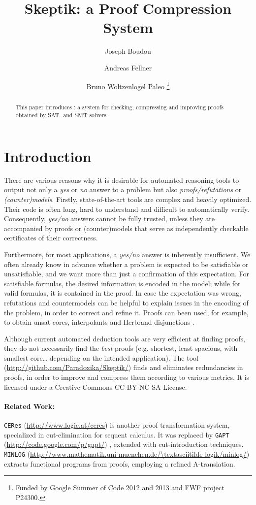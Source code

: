 \documentclass{llncs}
\title{ 
Skeptik: a Proof Compression System
}
\author{
  Joseph Boudou\inst{1}
  \and 
  Andreas Fellner\inst{2,3}
  \and 
  Bruno Woltzenlogel Paleo\inst{3}
  \thanks{Funded by Google Summer of Code 2012 and 2013 and FWF project P24300.}
}
\institute{
  IRIT, Universit\'e de Toulouse, France \\
  \email{joseph.boudou@irit.fr}
  \and 
  Free University of Bolzano, Italy \\
  \email{fellner.a@gmail.com}
  \and 
  Vienna University of Technology, Austria \\
  \email{bruno@logic.at}
}
\begin{document}
\maketitle


\begin{abstract}
This paper introduces \skeptik: a system for checking, compressing and improving proofs obtained by SAT- and SMT-solvers.
\end{abstract}

\setcounter{footnote}{0}


\section{Introduction}

There are various reasons why it is desirable 
for automated reasoning
tools to output not only a \emph{yes} or \emph{no} answer to a problem 
but also \emph{proofs/refutations} or \emph{(counter)models}. 
%
Firstly, state-of-the-art tools are complex and heavily optimized. Their code is often long, hard to understand and difficult to automatically verify. Consequently, \emph{yes/no} answers cannot be fully trusted, unless they are accompanied by proofs or (counter)models that serve as independently checkable certificates of 
their correctness. 

Furthermore, for most applications, a \emph{yes/no} answer is inherently insufficient. We often already know in advance whether a problem is expected to be satisfiable or unsatisfiable, and we want more than just a confirmation of this expectation. For satisfiable formulas, the desired information is encoded in the model; while for valid formulas, it is contained in the proof. In case the expectation was wrong, refutations and countermodels can be helpful to explain issues in the encoding of the problem, in order to correct and refine it. Proofs can been used, for example, to obtain unsat cores, interpolants and Herbrand disjunctions \cite{Paleo2008Herbrand}.

Although current automated deduction tools are very efficient at finding proofs, they do not necessarily find the \emph{best} proofs (e.g. shortest, least spacious, with smallest core\ldots{} depending on the intended application). The {\skeptik} tool (\url{http://github.com/Paradoxika/Skeptik/}) finds and eliminates redundancies in proofs, in order to improve and compress them according to various metrics. It is licensed under a Creative Commons CC-BY-NC-SA License.


\paragraph{Related Work:} \texttt{CERes} (\url{http://www.logic.at/ceres})
\cite{CERes} 
is another proof transformation system, specialized in cut-elimination for sequent calculus. It was replaced by \texttt{GAPT} (\url{http://code.google.com/p/gapt/}) \cite{GAPT}, 
extended with cut-introduction techniques.
\texttt{MINLOG} (\url{http://www.mathematik.uni-muenchen.de/\textasciitilde logik/minlog/}) 
extracts functional programs from proofs, employing a refined A-translation.
\end{document}
